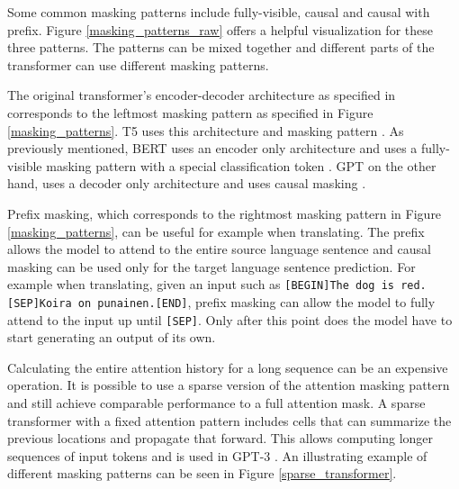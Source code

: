 \documentclass[twoside]{article}
\begin{document}
Some common masking patterns include fully-visible, causal and causal with prefix.
Figure \ref{masking_patterns_raw} offers a helpful visualization for these three
patterns. 
The patterns can be mixed together and different parts of the transformer can use different
masking patterns.

The original transformer's encoder-decoder architecture as specified in 
\cite{vaswani_attention_2017} corresponds to the leftmost masking pattern as
specified in Figure \ref{masking_patterns}. T5 uses this architecture and masking pattern
\cite{raffel_exploring_2020}. As previously mentioned, BERT uses an encoder
only architecture \cite{devlin_bert_2019} and uses a fully-visible masking 
pattern with a special classification token \cite{raffel_exploring_2020}. GPT on
the other hand, uses a decoder only architecture \cite{radford_improving_nodate}
and uses causal masking \cite{liu_generating_2018}.

Prefix masking, which corresponds to the rightmost masking pattern in Figure 
\ref{masking_patterns}, can be useful for example when translating. The prefix allows the
model to attend to the entire source language sentence and causal masking can be 
used only for the target language sentence prediction. For example when translating, given an input
such as \texttt{[BEGIN]The dog is red.[SEP]Koira on punainen.[END]}, prefix masking 
can allow the model to fully attend to the input up until \texttt{[SEP]}. Only after this
point does the model have to start generating an output of its own.
 \cite{raffel_exploring_2020}

Calculating the entire attention history for a long sequence can be an expensive operation.
It is possible to use a sparse version of the attention masking pattern and still achieve 
comparable performance to a full attention mask. A sparse transformer with a fixed attention
pattern includes cells that can summarize the previous locations and propagate 
that forward. This allows computing longer sequences of input tokens and is used in GPT-3
\cite{brown_language_2020}. An illustrating example of different masking patterns
can be seen in Figure \ref{sparse_transformer}. \cite{child_generating_2019}
\end{document}
